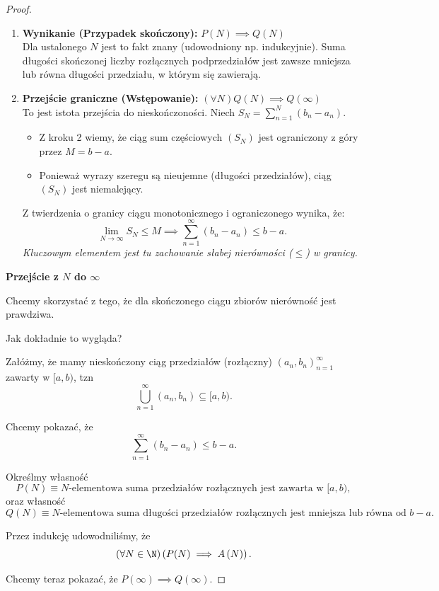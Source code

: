 \begin{proof}
\begin{enumerate}
    \item \textbf{Wynikanie (Przypadek skończony):} \quad $P(N) \implies Q(N)$ \\
    Dla ustalonego $N$ jest to fakt znany (udowodniony np. indukcyjnie). Suma długości skończonej liczby rozłącznych podprzedziałów jest zawsze mniejsza lub równa długości przedziału, w którym się zawierają.

    \item \textbf{Przejście graniczne (Wstępowanie):} \quad $(\forall N) Q(N) \implies Q(\infty)$ \\
    To jest istota przejścia do nieskończoności. Niech $S_N = \sum_{n=1}^{N} (b_n - a_n)$.
    \begin{itemize}
        \item Z kroku 2 wiemy, że ciąg sum częściowych $(S_N)$ jest ograniczony z góry przez $M = b - a$.
        \item Ponieważ wyrazy szeregu są nieujemne (długości przedziałów), ciąg $(S_N)$ jest niemalejący.
    \end{itemize}
    Z twierdzenia o granicy ciągu monotonicznego i ograniczonego wynika, że:
    \[
        \lim_{N \to \infty} S_N \le M \implies \sum_{n=1}^{\infty} (b_n - a_n) \le b - a.
    \]
    \textit{Kluczowym elementem jest tu zachowanie słabej nierówności ($\le$) w granicy.}
\end{enumerate}


	\noindent \textbf{Przejście z $N$ do $\infty$}

		Chcemy skorzystać z tego, że dla skończonego ciągu zbiorów nierówność jest prawdziwa.

		Jak dokładnie to wygląda?

		Załóżmy, że mamy nieskończony ciąg przedziałów (rozłączny) $\left( a_{n}, b_{n} \right)_{n=1}^{\infty}$ zawarty w $[a,b)$, tzn
		\[
		\bigcup_{n=1}^{\infty}\left( a_{n}, b_{n} \right) \subseteq [a,b)
		.\] 
		
		Chcemy pokazać, że 
		\[
		\sum_{n = 1}^{\infty} (b_{n}-a_{n}) \le b-a	
		.\] 

	Określmy własność 
	\[P\left( N \right) \equiv N\text{-elementowa suma przedziałów rozłącznych jest zawarta w } [a,b),\]
	oraz własność 
	\[
	Q\left( N \right) \equiv N\text{-elementowa suma długości przedziałów rozłącznych jest mniejsza lub równa od }b-a  
	.\] 

	Przez indukcję udowodniliśmy, że
	\[
	\left(\forall N\in \N \right) \left(P(N) \implies A\left( N\right)\right)  
	.\] 

	Chcemy teraz pokazać, że $P\left(\infty \right) \implies Q\left( \infty \right) $.


\end{proof}
